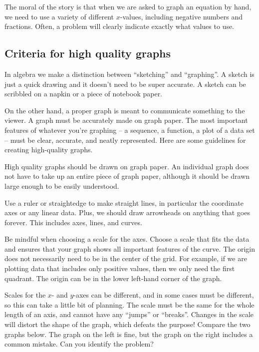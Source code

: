 The moral of the story is that when we are asked to graph an equation by hand, we need to use a variety of different $x$-values, including negative numbers and fractions. Often, a problem will clearly indicate exactly what values to use.

\subsection{Criteria for high quality graphs}

In algebra we make a distinction between ``sketching'' and ``graphing''. A sketch is just a quick drawing and it doesn't need to be super accurate. A sketch can be scribbled on a napkin or a piece of notebook paper.

On the other hand, a proper graph is meant to communicate something to the viewer. A graph must be accurately made on graph paper. The most important features of whatever you're graphing -- a sequence, a function, a plot of a data set -- must be clear, accurate, and neatly represented. Here are some guidelines for creating high-quality graphs.

High quality graphs should be drawn on graph paper. An individual graph does not have to take up an entire piece of graph paper, although it should be drawn large enough to be easily understood.

Use a ruler or straightedge to make straight lines, in particular the coordinate axes or any linear data. Plus, we should draw arrowheads on anything that goes forever. This includes axes, lines, and curves.

Be mindful when choosing a scale for the axes. Choose a scale that fits the data and ensures that your graph shows all important features of the curve. The origin does not necessarily need to be in the center of the grid. For example, if we are plotting data that includes only positive values, then we only need the first quadrant. The origin can be in the lower left-hand corner of the graph.

Scales for the $x$- and $y$-axes can be different, and in some cases must be different, so this can take a little bit of planning. The scale must be the same for the whole length of an axis, and cannot have any ``jumps'' or ``breaks''. Changes in the scale will distort the shape of the graph, which defeats the purpose! Compare the two graphs below. The graph on the left is fine, but the graph on the right includes a common mistake. Can you identify the problem?

